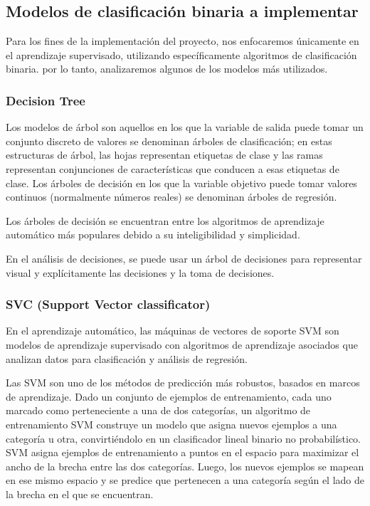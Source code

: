 \subsection{Modelos de clasificación binaria a implementar}
Para los fines de la implementación del proyecto, nos enfocaremos únicamente en el aprendizaje supervisado, utilizando específicamente algoritmos de clasificación binaria. por lo tanto, analizaremos algunos de los modelos más utilizados. \par
\subsubsection{ Decision Tree} \par

Los modelos de árbol son aquellos en los que la variable de salida puede tomar un conjunto discreto de valores se denominan árboles de clasificación; en estas estructuras de árbol, las hojas representan etiquetas de clase y las ramas representan conjunciones de características que conducen a esas etiquetas de clase. Los árboles de decisión en los que la variable objetivo puede tomar valores continuos (normalmente números reales) se denominan árboles de regresión. \par

Los árboles de decisión se encuentran entre los algoritmos de aprendizaje automático más populares debido a su inteligibilidad y simplicidad.\par

En el análisis de decisiones, se puede usar un árbol de decisiones para representar visual y explícitamente las decisiones y la toma de decisiones.\par

\subsubsection{ SVC (Support Vector classificator)} \par
En el aprendizaje automático, las máquinas de vectores de soporte SVM son modelos de aprendizaje supervisado con algoritmos de aprendizaje asociados que analizan datos para clasificación y análisis de regresión. \par 
Las SVM son uno de los métodos de predicción más robustos, basados en marcos de aprendizaje. Dado un conjunto de ejemplos de entrenamiento, cada uno marcado como perteneciente a una de dos categorías, un algoritmo de entrenamiento SVM construye un modelo que asigna nuevos ejemplos a una categoría u otra, convirtiéndolo en un clasificador lineal binario no probabilístico. SVM asigna ejemplos de entrenamiento a puntos en el espacio para maximizar el ancho de la brecha entre las dos categorías. Luego, los nuevos ejemplos se mapean en ese mismo espacio y se predice que pertenecen a una categoría según el lado de la brecha en el que se encuentran.\par

